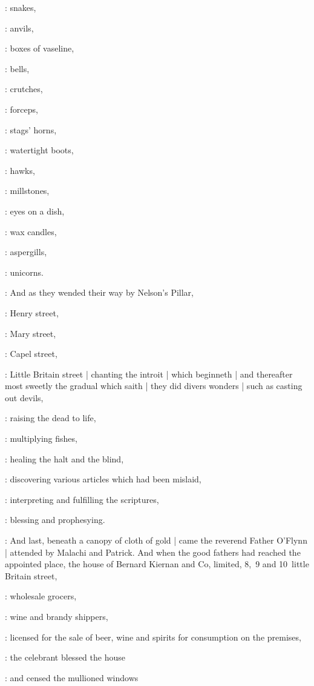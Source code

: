:
snakes,

:
anvils,

:
boxes of vaseline,

:
bells,

:
crutches,

:
forceps,

:
stags' horns,

:
watertight boots,

:
hawks,

:
millstones,

:
eyes on a dish,

:
wax candles,

:
aspergills,

:
unicorns.

:
And as they wended their way by Nelson's Pillar,

:
Henry street,

:
Mary street,

:
Capel street,

:
Little Britain street |
chanting the introit  |
which beginneth
 |
and thereafter most sweetly the gradual 
which saith  |
they did divers wonders |
such as casting out devils,

:
raising the dead to life,

:
multiplying fishes,

:
healing the halt and the blind,

:
discovering various articles which had been mislaid,

:
interpreting and fulfilling the scriptures,

:
blessing and prophesying.

:
And last,
beneath a canopy of cloth of gold |
came the reverend Father O'Flynn |
attended by Malachi and Patrick.
And when the good fathers had reached the appointed place,
the house of Bernard Kiernan and Co,
limited,
8,~9 and 10~little Britain street,

:
wholesale grocers,

:
wine and brandy shippers,

:
licensed for the sale of beer,
wine and spirits for consumption on the premises,

:
the celebrant blessed the house

:
and censed the mullioned windows 

